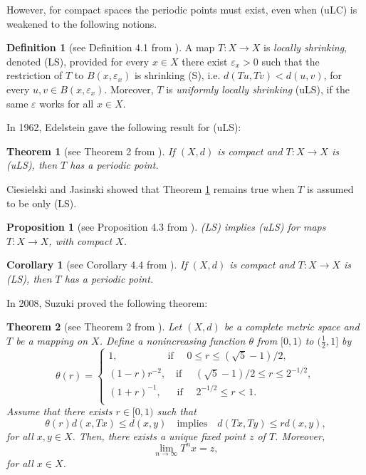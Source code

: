 \documentclass[12 pt]{article}
\theoremstyle{lema}
\theoremstyle{proposition}
\newtheorem{proposition}{Proposition}[section]
\theoremstyle{theorem}
\newtheorem{theorem}{Theorem}[section]
\theoremstyle{theorem}
\theoremstyle{corollary}
\newtheorem{corollary}{Corollary}[section]
\theoremstyle{definition}
\newtheorem{definition}{Definition}[section]
\theoremstyle{example}
\begin{document}
	However, for compact spaces the periodic points must exist, even when (uLC) is weakened to the following notions.
	
	\begin{definition}[see Definition 4.1 from \cite{Cieselski}]
		A map \(T : X \to X \) is \textit{locally shrinking}, denoted (LS), provided for every \(x \in X\) there exist $\varepsilon_x > 0$ such that the restriction of \(T\) to \(B(x,\varepsilon_x)\) is shrinking (S), i.e. \(d(Tu,Tv) < d(u,v)\), for every \(u,v \in B(x,\varepsilon_x)\). Moreover, \(T\) is \textit{uniformly locally shrinking} (uLS), if the same $\varepsilon$ works for all $x \in X$.
	\end{definition}

	In 1962, Edelstein \cite{Edelstein} gave the following result for (uLS):
	
	\begin{theorem}[see Theorem 2 from \cite{Edelstein}]
		If \((X,d)\) is compact and \(T : X \to X \) is (uLS), then \(T\) has a periodic point.
	\label{Th1.10}
	\end{theorem}

	Ciesielski and Jasinski \cite{Cieselski} showed that Theorem \ref{Th1.10} remains true when \(T\) is assumed to be only (LS).
	
	\begin{proposition}[see Proposition 4.3 from \cite{Cieselski}]
		(LS) implies (uLS) for maps \(T : X \to X \), with compact $X$.
	\end{proposition}

	\begin{corollary}[see Corollary 4.4 from \cite{Cieselski}]
		If \((X,d)\) is compact and \(T : X \to X \) is (LS), then \(T\) has a periodic point.
	\end{corollary}

	In 2008, Suzuki \cite{Suzuki} proved the following theorem:
	
	\begin{theorem}[see Theorem 2 from \cite{Suzuki}]
		Let \((X,d)\) be a complete metric space and \(T\) be a mapping on \(X\). Define a nonincreasing function $\theta$ from $[0,1)$ to $(\frac12,1]$ by
		\[ \theta(r) = \begin{cases}
			1, \qquad\qquad\quad  \text{if  } \quad 0 \leq r \leq (\sqrt{5}-1)/2,\\
				(1-r)r^{-2}, \quad \text{if  } \quad (\sqrt{5}-1)/2 \leq r \leq 2^{-1/2},\\
					(1+r)^{-1}, \;\;\quad \text{if  } \quad 2^{-1/2} \leq r < 1.\\
		\end{cases}\]
		Assume that there exists $r \in [0,1)$ such that 
		\[\theta(r) d(x,Tx) \leq d(x,y) \quad \text{implies} \quad d(Tx,Ty) \leq r d(x,y),\]
		for all \(x,y \in X\). Then, there exists a unique fixed point \(z\)  of \(T\). Moreover, 
		\[\lim\limits_{n\to \infty} T^nx = z,\]
		for all $x \in X$.
	\label{Th1.13}
	\end{theorem}
\end{document}

